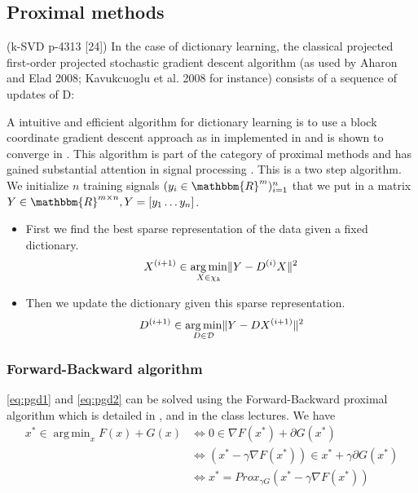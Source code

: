 \documentclass[a4paper,11pt]{article}
\newcommand{\RR}{\mathbbm{R}} %
\DeclarePairedDelimiter\norm{\lVert}{\rVert} %
\DeclareMathOperator*{\argmin}{arg\,min} %
\begin{document}
\subsection{Proximal methods}
\cite{olshausen97} (k-SVD p-4313 [24])
In the case of dictionary learning, the classical projected first-order projected stochastic gradient
descent algorithm (as used by Aharon and Elad 2008; Kavukcuoglu et al. 2008 for instance) consists
of a sequence of updates of D:



A intuitive and efficient algorithm for dictionary learning is to use a block coordinate gradient descent approach as in implemented in \cite{nt4} and is shown to converge in \cite{tseng01}.
This algorithm is part of the category of proximal methods and has gained substantial attention in signal processing \cite{combettes11}.
This is a two step algorithm.
We initialize $n$ training signals $(y_i \in \RR^m)_{i=1}^{n}$
that we put in a matrix $Y \in \RR^{m \times n}, Y = [y_1 \ldots y_n]$.
\begin{itemize}
  \item First we find the best sparse representation of the data given a fixed dictionary.
  	\begin{equation} \label{eq:pgd1}
      X^{(i+1)} \in \argmin_{X \in \chi_k} \norm{Y - D^{(i)}X}^2
	\end{equation}
  \item Then we update the dictionary given this sparse representation.
  	\begin{equation} \label{eq:pgd2}
      D^{(i+1)} \in \argmin_{D \in \mathcal{D}} \norm{Y - DX^{(i+1)}}^2
	\end{equation}
\end{itemize}


\subsubsection*{Forward-Backward algorithm}
\ref{eq:pgd1} and \ref{eq:pgd2} can be solved using the Forward-Backward proximal algorithm which is detailed in \cite{combettes11}, \cite{parikh14} and in the class lectures.
We have
\begin{equation*}
\begin{split}
x^* \in \argmin_x F(x) + G(x) & \Longleftrightarrow 0 \in \nabla F(x^*) + \partial G(x^*)\\
							  & \Longleftrightarrow (x^* - \gamma \nabla F(x^*)) \in x^* + \gamma \partial G(x^*)\\
                              & \Longleftrightarrow x^* = Prox_{\gamma G} (x^* - \gamma \nabla F(x^*))
\end{split}
\end{equation*}
\end{document}
